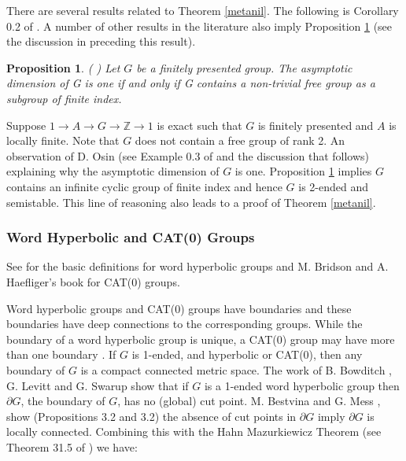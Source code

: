 \documentclass[12pt]{article}
\newtheorem{proposition}[theorem]{Proposition}
\newcounter{definitionnum}
\newenvironment{definition}{\addvspace{12pt}\refstepcounter{definitionnum}
\noindent{\bf Definition \arabic{definitionnum}.}}{\par\addvspace{12pt}}
\begin{document}
There are several results related to Theorem \ref{metanil}. 
The following is Corollary 0.2 of \cite{FW07}. A number of other results in the literature also imply Proposition \ref{AD1} (see the discussion in  \cite{FW07} preceding this result).
 
\begin{proposition} ( \cite{FW07}) \label{AD1}  Let $G$ be a finitely presented group. The asymptotic dimension of G is one if and only if G contains a non-trivial free group as a subgroup of finite index.
\end{proposition}
Suppose $1\to A\to G\to \mathbb Z\to 1$ is exact such that $G$ is finitely presented and $A$ is locally finite. Note that $G$ does not contain a free group of rank 2. An observation of D. Osin (see Example 0.3 of  \cite{FW07} and the discussion that follows) explaining why the asymptotic dimension of $G$ is one. Proposition \ref{AD1} implies $G$ contains an infinite cyclic group of finite index and hence $G$ is 2-ended and semistable. This line of reasoning also leads to a proof of Theorem \ref{metanil}.



\subsubsection{Word Hyperbolic and CAT(0) Groups}\label{WHyp}




See \cite{ABC91} for the basic definitions for word hyperbolic groups and M. Bridson and A. Haefliger's book \cite{BrHa99} for CAT(0) groups. 

Word hyperbolic groups and CAT(0) groups have boundaries and these boundaries have deep connections to the corresponding groups. While the boundary of a word hyperbolic group is unique, a CAT(0) group may have more than one boundary \cite{CK}. If $G$ is 1-ended, and hyperbolic or CAT(0), then any boundary of $G$ is a compact connected metric space. 
The work of B. Bowditch \cite{Bow99B},  G. Levitt \cite{Lev98} and G. Swarup \cite{Swarup} show that if $G$ is a 1-ended word hyperbolic group then $\partial G$, the boundary of $G$, has no (global) cut point. M. Bestvina and G. Mess \cite{BM91}, show (Propositions 3.2 and 3.2) the absence of cut points in $\partial G$ imply $\partial G$ is locally connected. Combining this with the Hahn Mazurkiewicz Theorem (see Theorem 31.5 of \cite{W70}) we have:
 
\end{document}
